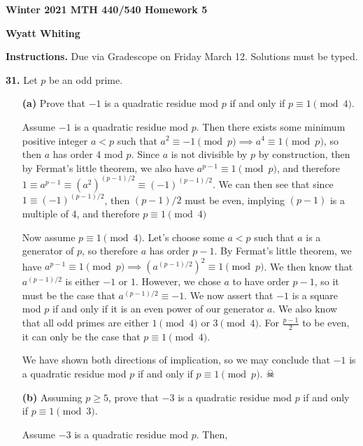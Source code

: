 \documentclass[12pt]{amsart}
\begin{document}
{\bf Winter 2021 MTH 440/540 Homework 5}

{\bf Wyatt Whiting}

\medskip

{\bf Instructions.}  Due via Gradescope on Friday March 12.  Solutions must be typed.  

\medskip

{\bf 31.}   Let $p$ be an odd prime.  

\begin{itemize}
\item[{\bf (a)}] Prove that $-1$ is a quadratic residue mod $p$ if and only if $p\equiv1\pmod{4}$.

\medskip

Assume $-1$ is a quadratic residue mod $p$. Then there exists some minimum positive integer $a < p$ such that $a^2\equiv -1\pmod{p} \implies a^4\equiv 1\pmod{p}$, so then $a$ has order 4 mod $p$. Since $a$ is not divisible by $p$ by construction, then by Fermat's little theorem, we also have $a^{p-1}\equiv 1\pmod{p}$, and therefore $1\equiv a^{p-1} \equiv (a^2)^{(p-1)/2}\equiv (-1)^{(p-1)/2}$. We can then see that since $1 \equiv (-1)^{(p-1)/2}$, then $(p-1)/2$ must be even, implying $(p-1)$ is a multiple of 4, and therefore $p\equiv 1\pmod{4}$

\smallskip

Now assume $p \equiv 1\pmod{4}$. Let's choose some $a<p$ such that $a$ is a generator of $p$, so therefore $a$ has order $p-1$. By Fermat's little theorem, we have $a^{p-1}\equiv 1\pmod{p} \implies (a^{(p-1)/2})^2 \equiv 1\pmod{p}$. We then know that $a^{(p-1)/2}$ is either $-1$ or $1$. However, we chose $a$ to have order $p-1$, so it must be the case that $a^{(p-1)/2}\equiv -1$. We now assert that $-1$ is a square mod $p$ if and only if it is an even power of our generator $a$. We also know that all odd primes are either $1\pmod{4}$ or $3\pmod{4}$. For $\frac{p-1}{2}$ to be even, it can only be the case that $p\equiv 1\pmod{4}$.

\smallskip

We have shown both directions of implication, so we may conclude that $-1$ is a quadratic residue mod $p$ if and only if $p\equiv 1\pmod{p}$. $\skull$

\item[{\bf (b)}] Assuming $p\geq5$, prove that $-3$ is a quadratic residue mod $p$ if and only if $p\equiv1\pmod{3}$.

\medskip

Assume $-3$ is a quadratic residue mod $p$. Then,


\end{itemize}
\end{document}
